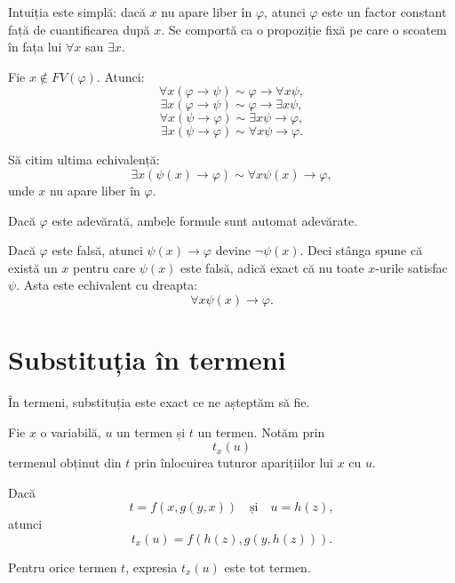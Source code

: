 Intuiția este simplă: dacă \(x\) nu apare liber în \( \varphi \), atunci \( \varphi \) este un factor constant față de cuantificarea după \(x\). Se comportă ca o propoziție fixă pe care o scoatem în fața lui \( \forall x \) sau \( \exists x \).

\begin{prop}
	Fie \(x \notin FV(\varphi)\). Atunci:
	\[
		\forall x(\varphi \to \psi) \sim \varphi \to \forall x\psi,
	\]
	\[
		\exists x(\varphi \to \psi) \sim \varphi \to \exists x\psi,
	\]
	\[
		\forall x(\psi \to \varphi) \sim \exists x\psi \to \varphi,
	\]
	\[
		\exists x(\psi \to \varphi) \sim \forall x\psi \to \varphi.
	\]
\end{prop}

\begin{eg}
	Să citim ultima echivalență:
	\[
		\exists x(\psi(x) \to \varphi) \sim \forall x\psi(x) \to \varphi,
	\]
	unde \(x\) nu apare liber în \( \varphi \).

	Dacă \( \varphi \) este adevărată, ambele formule sunt automat adevărate.

	Dacă \( \varphi \) este falsă, atunci \( \psi(x) \to \varphi \) devine \( \neg \psi(x) \). Deci stânga spune că există un \(x\) pentru care \( \psi(x) \) este falsă, adică exact că nu toate \(x\)-urile satisfac \( \psi \). Asta este echivalent cu dreapta:
	\[
		\forall x\psi(x) \to \varphi.
	\]
\end{eg}

\section{Substituția în termeni}

În termeni, substituția este exact ce ne așteptăm să fie.

\begin{definition}
	Fie \(x\) o variabilă, \(u\) un termen și \(t\) un termen. Notăm prin
	\[
		t_x(u)
	\]
	termenul obținut din \(t\) prin înlocuirea tuturor aparițiilor lui \(x\) cu \(u\).
\end{definition}

\begin{eg}
	Dacă
	\[
		t = f(x,g(y,x))
		\quad \text{și} \quad
		u = h(z),
	\]
	atunci
	\[
		t_x(u)=f(h(z),g(y,h(z))).
	\]
\end{eg}

\begin{prop}
	Pentru orice termen \(t\), expresia \(t_x(u)\) este tot termen.
\end{prop}


